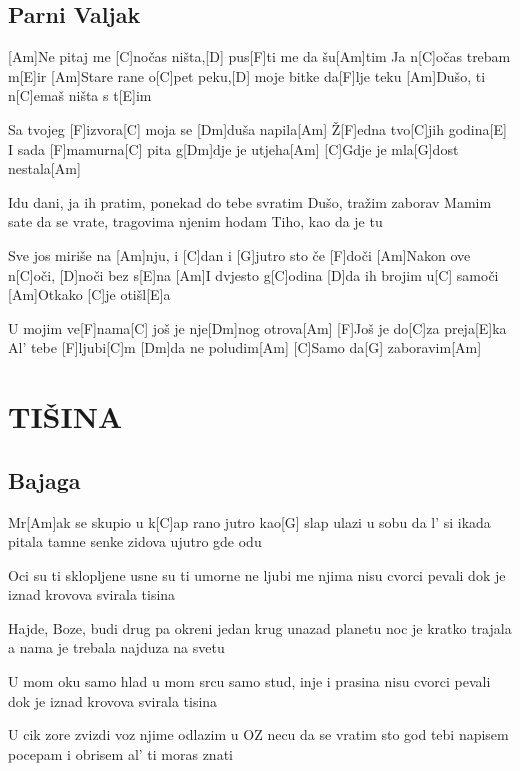 \documentclass{article}
\begin{document}
\begin{multicols}{2}
\subsection*{Parni Valjak}
\begin{guitar}
	

	[Am]Ne pitaj me [C]nočas ništa,[D] pus[F]ti me da šu[Am]tim
	Ja n[C]očas trebam m[E]ir
	[Am]Stare rane o[C]pet peku,[D] moje bitke da[F]lje teku
	[Am]Dušo, ti n[C]emaš ništa s t[E]im

	Sa tvojeg [F]izvora[C] moja se [Dm]duša napila[Am]
	Ž[F]edna tvo[C]jih godina[E]
	I sada [F]mamurna[C] pita g[Dm]dje je utjeha[Am]
	[C]Gdje je mla[G]dost nestala[Am]

	Idu dani, ja ih pratim, ponekad do tebe svratim
	Dušo, tražim zaborav
	Mamim sate da se vrate, tragovima njenim hodam
	Tiho, kao da je tu

	Sve jos miriše na [Am]nju, i [C]dan i [G]jutro sto če [F]doči
	[Am]Nakon ove n[C]oči, [D]noči bez s[E]na
	[Am]I dvjesto g[C]odina [D]da ih brojim u[C] samoči
	[Am]Otkako [C]je otišl[E]a

	U mojim ve[F]nama[C] još je nje[Dm]nog otrova[Am]
	[F]Još je do[C]za preja[E]ka
	Al' tebe [F]ljubi[C]m [Dm]da ne poludim[Am]
	[C]Samo da[G] zaboravim[Am]


\end{guitar}

\section*{TIŠINA}
%
\subsection*{Bajaga}
\begin{guitar}
	
	Mr[Am]ak se skupio u k[C]ap
	rano jutro kao[G] slap ulazi u sobu
	da l' si ikada pitala
	tamne senke zidova ujutro gde odu
	
	Oci su ti sklopljene
	usne su ti umorne
	ne ljubi me njima
	nisu cvorci pevali dok je
	iznad krovova svirala tisina
	
	Hajde, Boze, budi drug
	pa okreni jedan krug unazad planetu
	noc je kratko trajala
	a nama je trebala najduza na svetu
	
	U mom oku samo hlad
	u mom srcu samo stud, inje i prasina
	nisu cvorci pevali dok je
	iznad krovova svirala tisina
	
	U cik zore zvizdi voz
	njime odlazim u OZ
	necu da se vratim
	sto god tebi napisem
	pocepam i obrisem
	al' ti moras znati
	

\end{guitar}
\end{multicols}
\end{document}
